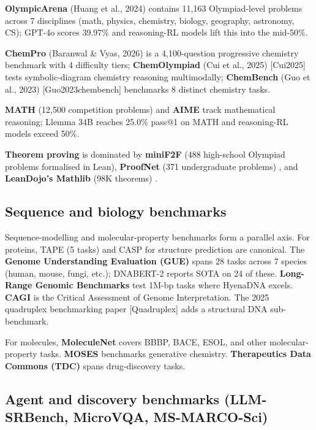 \documentclass{article}
\begin{document}
\textbf{OlympicArena} (Huang et al., 2024) \cite{huang2024olympicarenabenchm} contains 11,163 Olympiad-level problems across 7 disciplines (math, physics, chemistry, biology, geography, astronomy, CS); GPT-4o scores 39.97\% and reasoning-RL models lift this into the mid-50\%.

\textbf{ChemPro} (Baranwal \& Vyas, 2026) \cite{baranwal2026arxiv2602031082026} is a 4,100-question progressive chemistry benchmark with 4 difficulty tiers; \textbf{ChemOlympiad} (Cui et al., 2025) {[}Cui2025{]} tests symbolic-diagram chemistry reasoning multimodally; \textbf{ChemBench} (Guo et al., 2023) {[}Guo2023chembench{]} benchmarks 8 distinct chemistry tasks.

\textbf{MATH} (12,500 competition problems) and \textbf{AIME} track mathematical reasoning; Llemma 34B reaches 25.0\% pass@1 on MATH \cite{azerbayev2023llemmaanopenlangua} and reasoning-RL models exceed 50\%.

\textbf{Theorem proving} is dominated by \textbf{miniF2F} (488 high-school Olympiad problems formalised in Lean), \textbf{ProofNet} (371 undergraduate problems) \cite{azerbayev2023arxiv2302124332023}, and \textbf{LeanDojo's Mathlib} (98K theorems) \cite{yang2023leandojotheorempro}.

\subsection{Sequence and biology benchmarks}\label{sequence-and-biology-benchmarks}

Sequence-modelling and molecular-property benchmarks form a parallel axis. For proteins, TAPE (5 tasks) and CASP for structure prediction are canonical. The \textbf{Genome Understanding Evaluation (GUE)} spans 28 tasks across 7 species (human, mouse, fungi, etc.); DNABERT-2 \cite{zhou2023arxiv2306150062023} reports SOTA on 24 of these. \textbf{Long-Range Genomic Benchmarks} test 1M-bp tasks where HyenaDNA \cite{nguyen2023hyenadnalongrangeg} excels. \textbf{CAGI} is the Critical Assessment of Genome Interpretation. The 2025 quadruplex benchmarking paper {[}Quadruplex{]} adds a structural DNA sub-benchmark.

For molecules, \textbf{MoleculeNet} covers BBBP, BACE, ESOL, and other molecular-property tasks. \textbf{MOSES} benchmarks generative chemistry. \textbf{Therapeutics Data Commons (TDC)} spans drug-discovery tasks.

\subsection{Agent and discovery benchmarks (LLM-SRBench, MicroVQA, MS-MARCO-Sci)}\label{agent-and-discovery-benchmarks-llm-srbench-microvqa-ms-marco-sci}
\end{document}
